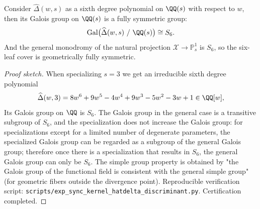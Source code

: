 \begin{proposition}\label{prop:sync-hatdelta-galois-s6-generic}
Consider \(\widehat\Delta(w,s)\) as a sixth degree polynomial on \(\QQ(s)\) with respect to \(w\), then its Galois group on \(\QQ(s)\) is a fully symmetric group:
\[
\mathrm{Gal}\bigl(\widehat\Delta(w,s)\ /\ \QQ(s)\bigr)\cong S_6.
\]
And the general monodromy of the natural projection \(\mathcal{X}\to\mathbb{P}^1_s\) is \(S_6\), so the six-leaf cover is geometrically fully symmetric.
\end{proposition}
\begin{proof}[Proof sketch]
When specializing \(s=3\) we get an irreducible sixth degree polynomial
\[
\widehat\Delta(w,3)=8w^6+9w^5-4w^4+9w^3-5w^2-3w+1\in\QQ[w],
\]
Its Galois group on \(\QQ\) is \(S_6\).
The Galois group in the general case is a transitive subgroup of \(S_6\), and the specialization does not increase the Galois group: for specializations except for a limited number of degenerate parameters, the specialized Galois group can be regarded as a subgroup of the general Galois group; therefore once there is a specialization that results in \(S_6\), the general Galois group can only be \(S_6\).
The simple group property is obtained by "the Galois group of the functional field is consistent with the general simple group" (for geometric fibers outside the divergence point).
Reproducible verification script: \texttt{scripts/exp\_sync\_kernel\_hatdelta\_discriminant.py}. Certification completed.
\end{proof}

